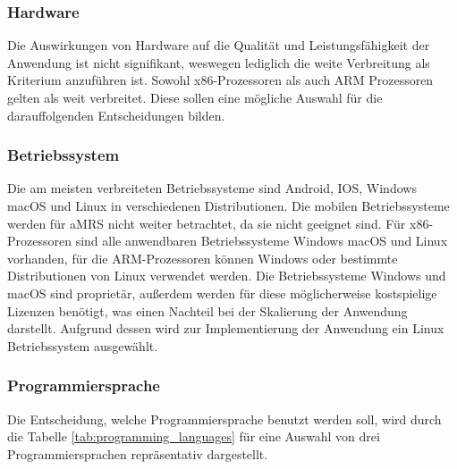 \subsubsection*{Hardware}
Die Auswirkungen von Hardware auf die Qualität und Leistungsfähigkeit der Anwendung ist nicht signifikant, weswegen lediglich die weite Verbreitung als Kriterium anzuführen ist.
Sowohl x86-Prozessoren als auch ARM Prozessoren gelten als weit verbreitet.
Diese sollen eine mögliche Auswahl für die darauffolgenden Entscheidungen bilden.
\subsubsection*{Betriebssystem}
Die am meisten verbreiteten Betriebssysteme sind Android, IOS, Windows macOS und Linux in verschiedenen Distributionen.
Die mobilen Betriebssysteme werden für \ac{aMRS} nicht weiter betrachtet, da sie nicht geeignet sind.
Für x86-Prozessoren sind alle anwendbaren Betriebssysteme Windows macOS und Linux vorhanden, für die ARM-Prozessoren können Windows oder bestimmte Distributionen von Linux verwendet werden.
Die Betriebssysteme Windows und macOS sind proprietär, außerdem werden für diese möglicherweise kostspielige Lizenzen benötigt, was einen Nachteil bei der Skalierung der Anwendung darstellt.
Aufgrund dessen wird zur Implementierung der Anwendung ein Linux Betriebssystem ausgewählt.

\subsubsection*{Programmiersprache}

Die Entscheidung, welche Programmiersprache benutzt werden soll, wird durch die Tabelle \ref{tab:programming_languages} für eine Auswahl von drei Programmiersprachen repräsentativ dargestellt.

